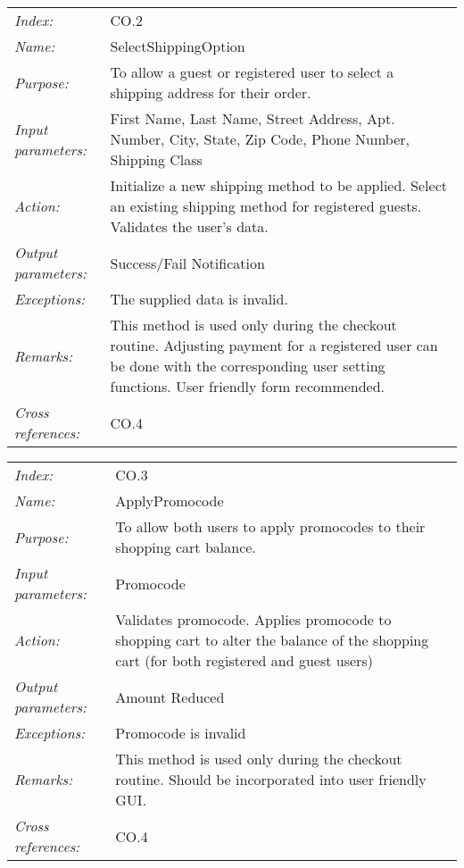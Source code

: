 \documentclass[10pt,letter]{article}
\begin{document}
\begin{tabularx}{\textwidth}{l X}

    \it{Index:} & CO.2 \\

    \it{Name:} & SelectShippingOption \\

    \it{Purpose:} & To allow a guest or registered user to select a shipping address for their order.\\

    \it{Input parameters:} & First Name, Last Name, Street Address, Apt. Number, City, State, Zip Code, Phone Number, Shipping Class \\

    \it{Action:} & Initialize a new shipping method to be applied. Select an existing shipping method for registered guests. Validates the user's data.\\


    \it{Output parameters:} & Success/Fail Notification  \\

    \it{Exceptions:} & The supplied data is invalid. \\

    \it{Remarks:} & This method is used only during the checkout routine. Adjusting payment for a registered user can be done with the corresponding user setting functions. User friendly form recommended. \\

    \it{Cross references:} & CO.4\\

    \hline

\end{tabularx}
\begin{tabularx}{\textwidth}{l X}

    \it{Index:} & CO.3 \\

    \it{Name:} & ApplyPromocode \\

    \it{Purpose:} & To allow both users to apply promocodes to their shopping cart balance. \\

    \it{Input parameters:} & Promocode \\

    \it{Action:} & Validates promocode. Applies promocode to shopping cart to alter the balance of the shopping cart (for both registered and guest users)\\

    \it{Output parameters:} & Amount Reduced  \\

    \it{Exceptions:} & Promocode is invalid\\

    \it{Remarks:} & This method is used only during the checkout routine. Should be incorporated into user friendly GUI.\\

    \it{Cross references:} & CO.4 \\

    \hline

\end{tabularx}
\end{document}
